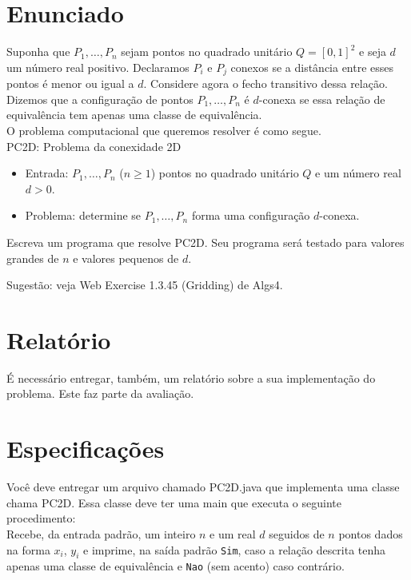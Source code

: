 \documentclass[a4paper,11pt]{article}
\title{\normalfont{Enunciado - Problema da Conexidadade 2D}}
\date{\today}
\begin{document}
\maketitle %

\setcounter{tocdepth}{2} %


\section{Enunciado}
Suponha que $P_1,\dots,P_n$ sejam pontos no quadrado unitário $Q = [0,1]^2$ e seja $d$ um número real positivo. Declaramos $P_i$ e $P_j$ conexos se a distância entre esses pontos é menor ou igual a $d$. Considere agora o fecho transitivo dessa relação. Dizemos que a configuração de pontos $P_1,\dots,P_n$ é $d$-conexa se essa relação de equivalência tem apenas uma classe de equivalência. \\
O problema computacional que queremos resolver é como segue. \\
PC2D: Problema da conexidade 2D

\begin{itemize}
    \item Entrada: $P_1,\dots,P_n$ ($n\geq1$) pontos no quadrado unitário $Q$ e um número real $d>0$.
    \item Problema: determine se $P_1,\dots,P_n$ forma uma configuração $d$-conexa.
\end{itemize}

Escreva um programa que resolve PC2D. Seu programa será testado para valores grandes de $n$ e valores pequenos de $d$.

Sugestão: veja Web Exercise 1.3.45 (Gridding) de Algs4.

\section{Relatório}
É necessário entregar, também, um relatório sobre a sua implementação do problema. Este faz parte da avaliação.

\section{Especificações}
Você deve entregar um arquivo chamado PC2D.java que implementa uma classe chama PC2D. Essa classe deve ter uma main que executa o seguinte procedimento: \\
Recebe, da entrada padrão, um inteiro $n$ e um real $d$ seguidos de $n$ pontos dados na forma $x_i$, $y_i$ e imprime, na saída padrão \texttt{Sim}, caso a relação descrita tenha apenas uma classe de equivalência e \texttt{Nao} (sem acento) caso contrário. 
\end{document}
